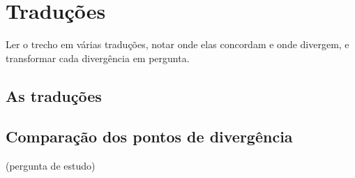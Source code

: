 \chapter{Traduções}\label{cap:traducoes}

\begin{objetivo}
Ler o trecho em várias traduções, notar onde elas concordam e onde divergem, e transformar cada divergência em pergunta.
\end{objetivo}

\section{As traduções}

\section{Comparação dos pontos de divergência}

\begin{pergunta}
(pergunta de estudo)
\end{pergunta}
